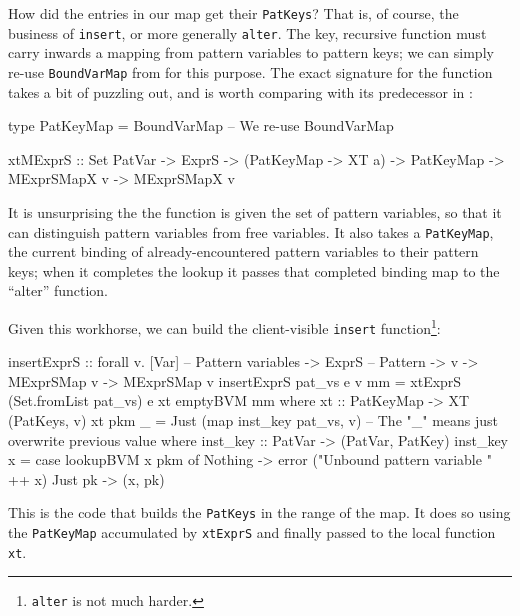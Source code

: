 \documentclass[acmsmall]{acmart}
\theoremstyle{theorem}
\theoremstyle{definition}
\theoremstyle{remark}
\begin{document}

How did the entries in our map get their \lstinline{PatKeys}?  That
is, of course, the business of \lstinline{insert}, or more generally
\lstinline{alter}.  The key, recursive function must carry inwards a mapping
from pattern variables to pattern keys; we can simply re-use \lstinline{BoundVarMap}
from  for this purpose.  The exact signature for the function takes
a bit of puzzling out, and is worth comparing with its predecessor in :
\begin{code}
type PatKeyMap = BoundVarMap   -- We re-use BoundVarMap

xtMExprS :: Set PatVar -> ExprS -> (PatKeyMap -> XT a)
         -> PatKeyMap -> MExprSMapX v -> MExprSMapX v
\end{code}
It is unsurprising the the function is given the set of pattern variables, so that it
can distinguish pattern variables from free variables.  It also takes a \lstinline{PatKeyMap}, the
current binding of already-encountered pattern variables to their pattern keys;
when it completes the lookup it passes that completed binding map to the ``alter'' function.

Given this workhorse, we can build the client-visible \lstinline{insert} function\footnote{\lstinline{alter} is not much harder.}:
\begin{code}
insertExprS :: forall v. [Var]     -- Pattern variables
                         -> ExprS  -- Pattern
                         -> v -> MExprSMap v -> MExprSMap v
insertExprS pat_vs e v mm
  = xtExprS (Set.fromList pat_vs) e xt emptyBVM mm
  where
    xt :: PatKeyMap -> XT (PatKeys, v)
    xt pkm _ = Just (map inst_key pat_vs, v)
     -- The "_" means just overwrite previous value
     where
        inst_key :: PatVar -> (PatVar, PatKey)
        inst_key x = case lookupBVM x pkm of
                         Nothing -> error ("Unbound pattern variable " ++ x)
                         Just pk -> (x, pk)
\end{code}
This is the code that builds the \lstinline{PatKeys} in the range of the map.
It does so using the \lstinline{PatKeyMap} accumulated by \lstinline{xtExprS} and
finally passed to the local function \lstinline{xt}.
\end{document}
